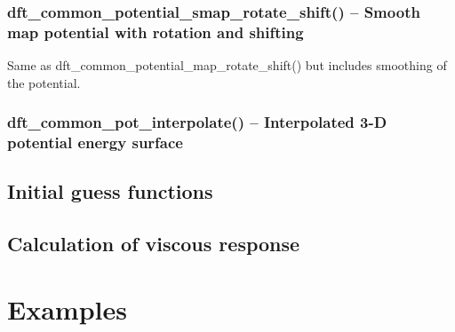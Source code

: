 \documentclass[12pt,letterpaper]{report}
\begin{document}
\subsection{dft\_common\_potential\_smap\_rotate\_shift() -- Smooth map potential with rotation and shifting}

Same as dft\_common\_potential\_map\_rotate\_shift() but includes smoothing of the potential.

\subsection{dft\_common\_pot\_interpolate() -- Interpolated 3-D potential energy surface}



\section{Initial guess functions}

\section{Calculation of viscous response}

\chapter{Examples}
\end{document}
